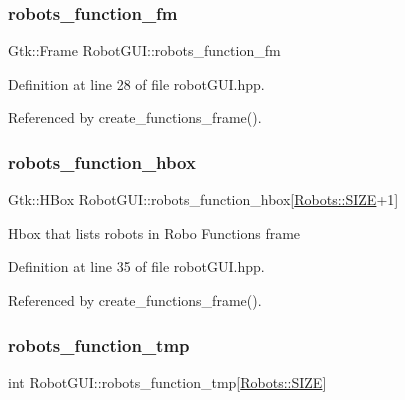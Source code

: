 \subsubsection{\texorpdfstring{robots\+\_\+function\+\_\+fm}{robots\_function\_fm}}
{\footnotesize\ttfamily Gtk\+::\+Frame Robot\+G\+U\+I\+::robots\+\_\+function\+\_\+fm\hspace{0.3cm}{\ttfamily [private]}}



Definition at line 28 of file robot\+G\+U\+I.\+hpp.



Referenced by create\+\_\+functions\+\_\+frame().

\mbox{\label{class_robot_g_u_i_aba8f9fd9d3cfea4e5b4fe262ac6e3c0b}} 
\subsubsection{\texorpdfstring{robots\+\_\+function\+\_\+hbox}{robots\_function\_hbox}}
{\footnotesize\ttfamily Gtk\+::\+H\+Box Robot\+G\+U\+I\+::robots\+\_\+function\+\_\+hbox\mbox{[}\hyperlink{class_robots_ae9df2f1d345ad6740f0459956cdd4712}{Robots\+::\+S\+I\+ZE}+1\mbox{]}\hspace{0.3cm}{\ttfamily [private]}}

Hbox that lists robots in Robo Functions frame 

Definition at line 35 of file robot\+G\+U\+I.\+hpp.



Referenced by create\+\_\+functions\+\_\+frame().

\mbox{\label{class_robot_g_u_i_a97cc6ff736a025294efe4e41d38164d3}} 
\subsubsection{\texorpdfstring{robots\+\_\+function\+\_\+tmp}{robots\_function\_tmp}}
{\footnotesize\ttfamily int Robot\+G\+U\+I\+::robots\+\_\+function\+\_\+tmp\mbox{[}\hyperlink{class_robots_ae9df2f1d345ad6740f0459956cdd4712}{Robots\+::\+S\+I\+ZE}\mbox{]}\hspace{0.3cm}{\ttfamily [private]}}



